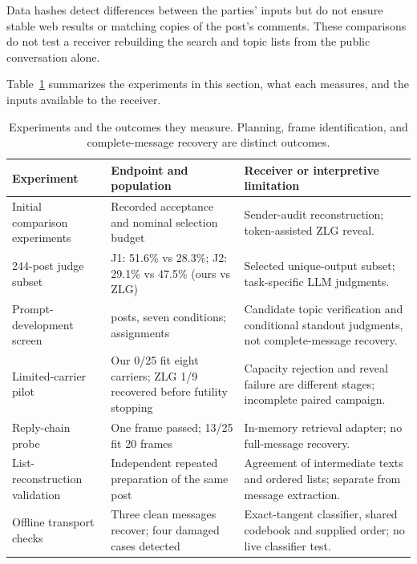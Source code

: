 Data hashes detect differences between the parties' inputs but do not ensure stable web results or matching copies of the post's comments. These comparisons do not test a receiver rebuilding the search and topic lists from the public conversation alone.







Table~\ref{tab:evidence-levels} summarizes the experiments in this section, what each measures, and the inputs available to the receiver.

\begin{table}[!htbp]
\centering\small
\caption{Experiments and the outcomes they measure. Planning, frame identification, and complete-message recovery are distinct outcomes.}
\label{tab:evidence-levels}
\begin{tabularx}{\columnwidth}{|p{}|X|X|}
\hline
Experiment & Endpoint and population & Receiver or interpretive limitation \\
\hline
Initial comparison experiments & Recorded acceptance and nominal selection budget & Sender-audit reconstruction; token-assisted ZLG reveal. \\
\hline
244-post judge subset & J1: 51.6\% vs 28.3\%; J2: 29.1\% vs 47.5\% (ours vs ZLG) & Selected unique-output subset; task-specific LLM judgments. \\
\hline
Prompt-development screen & \PaPosts{} posts, seven conditions; \PaGenerationAttempts{} assignments & Candidate topic verification and conditional standout judgments, not complete-message recovery. \\ \hline
Limited-carrier pilot & Our 0/25 fit eight carriers; ZLG 1/9 recovered before futility stopping & Capacity rejection and reveal failure are different stages; incomplete paired campaign. \\
\hline
Reply-chain probe & One frame passed; 13/25 fit 20 frames & In-memory retrieval adapter; no full-message recovery. \\
\hline
List-reconstruction validation & Independent repeated preparation of the same post & Agreement of intermediate texts and ordered lists; separate from message extraction. \\ \hline
Offline transport checks & Three clean messages recover; four damaged cases detected & Exact-tangent classifier, shared codebook and supplied order; no live classifier test. \\

\end{tabularx}
\end{table}
